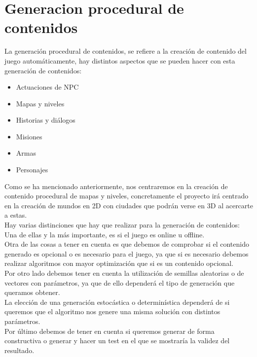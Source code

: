\chapter[Generacion procedural de contenidos]{\label{identificadorReferenciaCruzada}
Generacion procedural de contenidos}

La generación procedural de contenidos, se refiere a la creación de contenido del juego automáticamente, hay distintos aspectos que se pueden hacer con esta generación de contenidos:\\

\begin{itemize}
	\item Actuaciones de NPC
	\item Mapas y niveles
	\item Historias y diálogos
	\item Misiones
	\item Armas
	\item Personajes
\end{itemize}

Como se ha mencionado anteriormente, nos centraremos en la creación de contenido procedural de mapas y niveles, concretamente el proyecto irá centrado en la creación de mundos en 2D con ciudades que podrán verse en 3D al acercarte a estas.\\

Hay varias distinciones que hay que realizar para la generación de contenidos:\\

Una de ellas y la más importante, es si el juego es online u offline.\\

Otra de las cosas  a tener en cuenta es que debemos de comprobar si el contenido generado es opcional o es necesario para el juego, ya que si es necesario debemos realizar algoritmos con mayor optimización que si es un contenido opcional.\\

Por otro lado debemos tener en cuenta la utilización de  semillas aleatorias o de vectores con parámetros, ya que de ello dependerá el tipo de generación que queramos obtener.\\ 

La elección de una generación estocástica o determinística dependerá de si queremos que el algoritmo nos genere una misma solución con distintos parámetros.\\

Por último debemos de tener en cuenta si queremos generar de forma constructiva o generar y hacer un test en el que se mostraría la validez del resultado.\\

